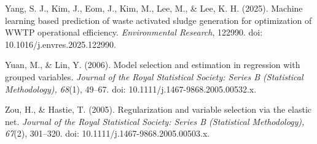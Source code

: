 \documentclass[a4paper,fleqn]{cas-sc}
\begin{document}
\noindent Yang, S. J., Kim, J., Eom, J., Kim, M., Lee, M., \& Lee, K. H. (2025). Machine learning based prediction of waste activated sludge generation for optimization of WWTP operational efficiency. \textit{Environmental Research}, 122990. doi: 10.1016/j.envres.2025.122990.

\noindent Yuan, M., \& Lin, Y. (2006). Model selection and estimation in regression with grouped variables. \textit{Journal of the Royal Statistical Society: Series B (Statistical Methodology), 68}(1), 49--67. doi: 10.1111/j.1467-9868.2005.00532.x.

\noindent Zou, H., \& Hastie, T. (2005). Regularization and variable selection via the elastic net. \textit{Journal of the Royal Statistical Society: Series B (Statistical Methodology), 67}(2), 301--320. doi: 10.1111/j.1467-9868.2005.00503.x.
\end{document}
